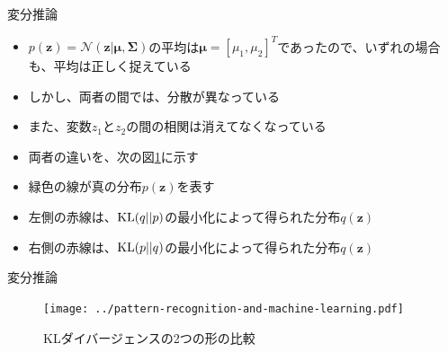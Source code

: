 \documentclass[dvipdfmx,notheorems,t]{beamer}
\begin{document}
\begin{frame}{変分推論}
\begin{itemize}
\begin{itemize}
		\item $p(\bm{z}) = \mathcal{N}(\bm{z} | \bm{\mu}, \bm{\Sigma})$の平均は$\bm{\mu} = \left[ \mu_1, \mu_2 \right]^T$であったので、いずれの場合も、\alert{平均は正しく捉えている}
		\item しかし、両者の間では、\alert{分散が異なっている}
		\item また、変数$z_1$と$z_2$の間の\alert{相関は消えてなくなっている}
		\newline
		\item 両者の違いを、次の図\ref{fig:comparison-between-kl-divergence}に示す
		\newline
		\item \color{green}緑色\normalcolor の線が真の分布$p(\bm{z})$を表す
		\item 左側の\color{red}赤線\normalcolor は、$\operatorname{KL}(q || p)$の最小化によって得られた分布$q(\bm{z})$
		\item 右側の\color{red}赤線\normalcolor は、$\operatorname{KL}(p || q)$の最小化によって得られた分布$q(\bm{z})$
	\end{itemize}
\end{itemize}

\end{frame}

\begin{frame}{変分推論}

\begin{figure}[h]
	\centering
	\texttt{[image: ../pattern-recognition-and-machine-learning.pdf]}
	\caption{KLダイバージェンスの2つの形の比較}
	\label{fig:comparison-between-kl-divergence}
\end{figure}

\end{frame}
\end{document}
